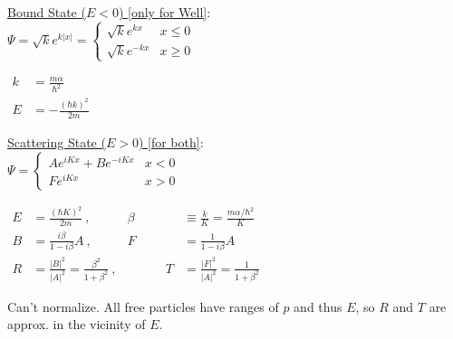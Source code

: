 \documentclass[12pt]{article}
\begin{document}
\vspace{25pt} \noindent
\begin{minipage}[t]{.45\textwidth}
    \setlength{\parindent}{.5cm}
    \noindent
    \underline{Bound State (\(E<0\)) {\scriptsize[only for Well]}}: \\[10pt]
    \hspace{18pt} \( \Psi = \sqrt{k} e^{k|x|} = \begin{cases} 
        \sqrt{k} e^{kx}  &   x \leq 0\\
        \sqrt{k} e^{-kx} &   x \geq 0
    \end{cases}\)
    
    \vspace{20pt} \noindent
    \(\begin{aligned}
        k &= \frac{m \alpha}{\hbar^2}\\[5pt]
        E &= - \frac{(\hbar k)^2}{2m}
    \end{aligned}\)    
\end{minipage}
\begin{minipage}[t]{.5\textwidth}
    \setlength{\parindent}{.5cm}
    \noindent
    \underline{Scattering State (\(E>0\)) {\scriptsize[for both]}}:\\[10pt] 
    \hspace{18pt} \(\Psi = \begin{cases}
        A e^{iKx} + B e^{-iKx}  &   x < 0\\
        F e^{iKx}               &   x > 0
    \end{cases}\)
    
    \vspace{20pt} \noindent
    \(\begin{aligned}
        E &= \frac{(\hbar K)^2}{2m} \ , & 
            \beta &\equiv \frac{k}{K} = \frac{m \alpha / \hbar^2}{K}\\[10pt]
        B &= \frac{i\beta}{1 - i\beta} A \ , &
            F &= \frac{1}{1- i\beta} A\\[10pt]
        R &= \frac{|B|^2}{|A|^2} = \frac{\beta^2}{1+\beta^2} \ , & \hspace{18pt} \hspace{18pt}
            T &= \frac{|F|^2}{|A|^2} = \frac{1}{1+\beta^2}
    \end{aligned}\)    

    \vspace{20pt} \noindent
    {\scriptsize Can't normalize. 
    All free particles have ranges of \(p\) and thus \(E\), so \(R\) and \(T\) are approx.
    in the vicinity of \(E\).}
\end{minipage}
\end{document}
